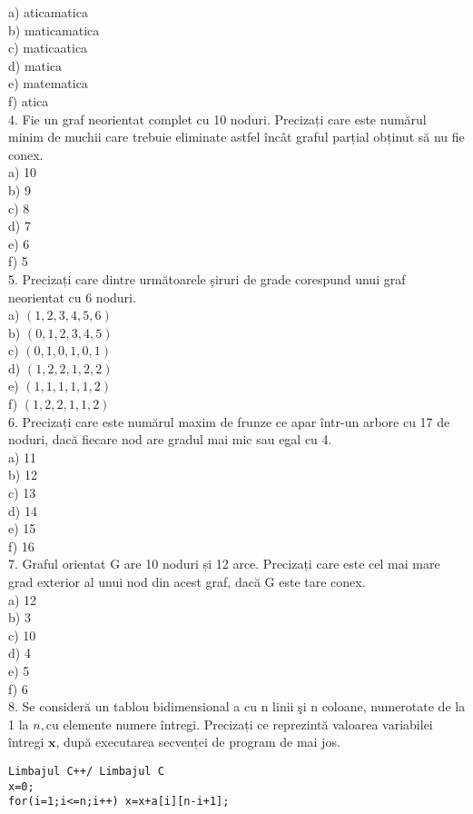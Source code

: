 a) aticamatica\\
b) maticamatica\\
c) maticaatica\\
d) matica\\
e) matematica\\
f) atica\\
4. Fie un graf neorientat complet cu 10 noduri. Precizați care este numărul minim de muchii care trebuie eliminate astfel încât graful parțial obținut să nu fie conex.\\
a) 10\\
b) 9\\
c) 8\\
d) 7\\
e) 6\\
f) 5\\
5. Precizați care dintre următoarele ș̦iruri de grade corespund unui graf neorientat cu 6 noduri.\\
a) $(1,2,3,4,5,6)$\\
b) $(0,1,2,3,4,5)$\\
c) $(0,1,0,1,0,1)$\\
d) $(1,2,2,1,2,2)$\\
e) $(1,1,1,1,1,2)$\\
f) $(1,2,2,1,1,2)$\\
6. Precizați care este numărul maxim de frunze ce apar într-un arbore cu 17 de noduri, dacă fiecare nod are gradul mai mic sau egal cu 4.\\
a) 11\\
b) 12\\
c) 13\\
d) 14\\
e) 15\\
f) 16\\
7. Graful orientat G are 10 noduri și 12 arce. Precizați care este cel mai mare grad exterior al unui nod din acest graf, dacă G este tare conex.\\
a) 12\\
b) 3\\
c) 10\\
d) 4\\
e) 5\\
f) 6\\
8. Se consideră un tablou bidimensional a cu n linii şi n coloane, numerotate de la 1 la $n, \mathrm{cu}$ elemente numere întregi. Precizați ce reprezintă valoarea variabilei întregi $\mathbf{x}$, după executarea secvenței de program de mai jos.

\begin{verbatim}
Limbajul C++/ Limbajul C
x=0;
for(i=1;i<=n;i++) x=x+a[i][n-i+1];
\end{verbatim}

